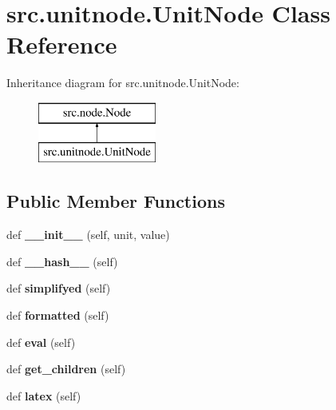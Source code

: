 \hypertarget{classsrc_1_1unitnode_1_1UnitNode}{}\section{src.\+unitnode.\+Unit\+Node Class Reference}
\label{classsrc_1_1unitnode_1_1UnitNode}
Inheritance diagram for src.\+unitnode.\+Unit\+Node\+:\begin{figure}[H]
\begin{center}
\leavevmode
\includegraphics[height=2.000000cm]{classsrc_1_1unitnode_1_1UnitNode}
\end{center}
\end{figure}
\subsection*{Public Member Functions}
\begin{DoxyCompactItemize}
\item 
\mbox{\label{classsrc_1_1unitnode_1_1UnitNode_acc72ea269b8094c1b70a4edd1cd4a188}} 
def {\bfseries \+\_\+\+\_\+init\+\_\+\+\_\+} (self, unit, value)
\item 
\mbox{\label{classsrc_1_1unitnode_1_1UnitNode_afcba67317c5fe2f6fada02667591151f}} 
def {\bfseries \+\_\+\+\_\+hash\+\_\+\+\_\+} (self)
\item 
\mbox{\label{classsrc_1_1unitnode_1_1UnitNode_af85c10b875266acff02c11d36aba1a92}} 
def {\bfseries simplifyed} (self)
\item 
\mbox{\label{classsrc_1_1unitnode_1_1UnitNode_a7b9c4f011f61d4ceeae2172d3631b92d}} 
def {\bfseries formatted} (self)
\item 
\mbox{\label{classsrc_1_1unitnode_1_1UnitNode_aa707963f0ef8340a3cc09e859eb938e3}} 
def {\bfseries eval} (self)
\item 
\mbox{\label{classsrc_1_1unitnode_1_1UnitNode_a2cd4eb0a34ed9d0b1c6fa76975b37033}} 
def {\bfseries get\+\_\+children} (self)
\item 
\mbox{\label{classsrc_1_1unitnode_1_1UnitNode_afbbbbc116b8bbd9497b73e53fb918bbf}} 
def {\bfseries latex} (self)
\end{DoxyCompactItemize}
